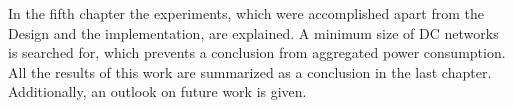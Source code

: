 In the fifth chapter the experiments, which were accomplished apart from the Design and the implementation, are explained. A minimum size of DC networks is searched for, which prevents a conclusion from aggregated power consumption.\\
All the results of this work are summarized as a conclusion in the last chapter. Additionally, an outlook on future work is given.






\cleardoublepage

